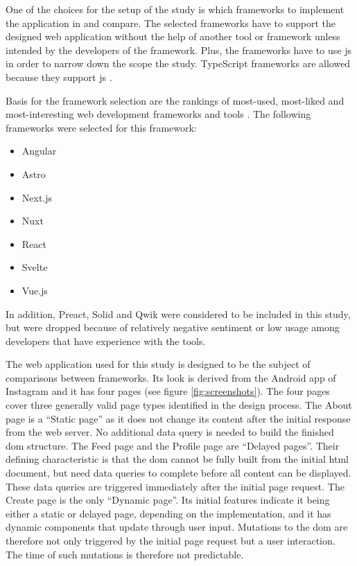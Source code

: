 \documentclass[a4paper, 12pt]{article}
\begin{document}
One of the choices for the setup of the study is which frameworks to implement the application in and compare.
The selected frameworks have to support the designed web application without the help of another tool or framework unless intended by the developers of the framework.
Plus, the frameworks have to use \acrfull{js}  in order to narrow down the scope the study.
TypeScript frameworks are allowed because they support \acrshort{js} \citep{typescript}.

Basis for the framework selection are the rankings of most-used, most-liked and most-interesting web development frameworks and tools \citep{stateOfJs2023}.
The following frameworks were selected for this framework:

\begin{multicols}{4}
\begin{itemize}
  \item Angular
  \item Astro
  \item Next.js
  \item Nuxt
  \item React
  \item Svelte
  \item Vue.js
\end{itemize}
\end{multicols}

In addition, Preact, Solid and Qwik were considered to be included in this study, but were dropped because of relatively negative sentiment or low usage among developers that have experience with the tools.

The web application used for this study is designed to be the subject of comparisons between frameworks.
Its look is derived from the Android app of Instagram \citep{instagram} and it has four pages (see figure \ref{fig:screenshots}).
The four pages cover three generally valid page types identified in the design process.
The About page is a \enquote{Static page} as it does not change its content after the initial response from the web server.
No additional data query is needed to build the finished \acrshort{dom} structure.
The Feed page and the Profile page are \enquote{Delayed pages}.
Their defining characteristic is that the \acrshort{dom} cannot be fully built from the initial \acrshort{html} document, but need data queries to complete before all content can be displayed.
These data queries are triggered immediately after the initial page request.
The Create page is the only \enquote{Dynamic page}.
Its initial features indicate it being either a static or delayed page, depending on the implementation, and it has dynamic components that update through user input.
Mutations to the \acrshort{dom} are therefore not only triggered by the initial page request but a user interaction.
The time of such mutations is therefore not predictable.
\end{document}
